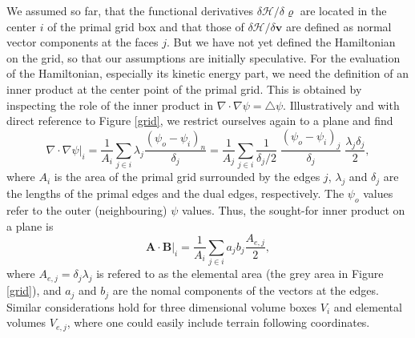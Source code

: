 We assumed so far, that the functional derivatives $\delta\mathcal{H}/\delta\varrho$ are located in the center $i$ of the primal grid box and that those of $\delta\mathcal{H}/\delta\mathbf{v}$ are defined as normal vector
components at the faces $j$. But we have not yet defined the Hamiltonian on the grid, so that our assumptions
are initially speculative.
For the evaluation of the Hamiltonian, especially its kinetic energy part, we need
the definition of an inner product at
the center point of the primal grid. This is obtained by inspecting the role of the inner product in $\nabla\cdot\nabla\psi=\triangle\psi$. Illustratively and with direct reference to Figure \ref{grid}, we restrict ourselves again to a plane and find
\begin{equation}
\nabla\cdot\nabla\psi|_i=\frac{1}{A_i}\sum_{j\in i}\lambda_j \frac{(\psi_{o}-\psi_{i})_n}{\delta_j}
=\frac{1}{A_j}\sum_{j\in i}\frac{1}{\delta_j/2}\;\frac{(\psi_{o}-\psi_{i})_j}{\delta_j}\;\frac{\lambda_j\delta_j}{2},
\end{equation}
where $A_i$ is the area of the primal grid surrounded by the edges $j$,
$\lambda_j$ and $\delta_j$ are the lengths of the primal edges and the dual edges, respectively. The $\psi_o$ values refer to the
outer (neighbouring) $\psi$ values. Thus, the sought-for inner product on a plane is
\begin{equation}
 \mathbf{A}\cdot\mathbf{B}|_i=\frac{1}{A_i}\sum_{j\in i}a_jb_j \frac{A_{e,j}}{2},
\end{equation}
where $A_{e,j}=\delta_j\lambda_j$ is refered to as the elemental area (the grey area in Figure \ref{grid}), and $a_j$ and $b_j$ are the nomal components of the vectors at the
edges. Similar considerations hold for three dimensional volume boxes $V_i$ and elemental volumes $V_{e,j}$, where one could easily include terrain following coordinates.

